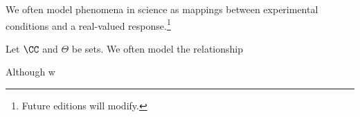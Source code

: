 

We often model phenomena in science as mappings between experimental conditions and a real-valued response.\footnote{Future editions will modify.}


Let $\CC$ and $\Theta$ be sets.
We often model the relationship



Although w


\blankpage
